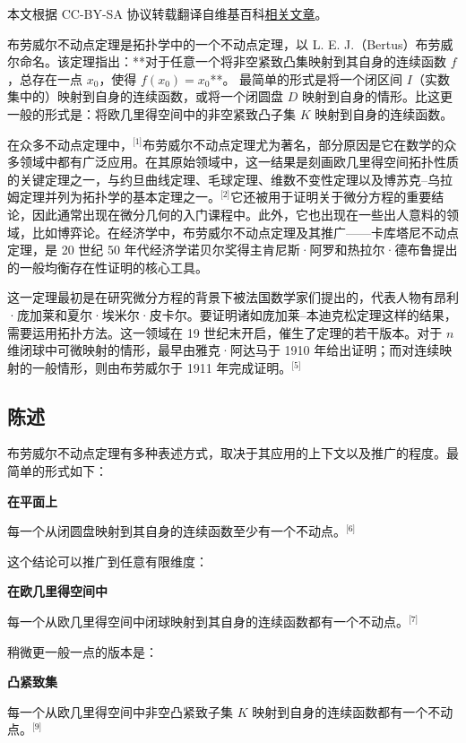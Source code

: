 
本文根据 CC-BY-SA 协议转载翻译自维基百科\href{https://en.wikipedia.org/wiki/Brouwer_fixed-point_theorem}{相关文章}。

布劳威尔不动点定理是拓扑学中的一个不动点定理，以 L. E. J.（Bertus）布劳威尔命名。该定理指出：**对于任意一个将非空紧致凸集映射到其自身的连续函数 $f$，总存在一点 $x_0$，使得 $f(x_0) = x_0$**。
最简单的形式是将一个闭区间 $I$（实数集中的）映射到自身的连续函数，或将一个闭圆盘 $D$ 映射到自身的情形。比这更一般的形式是：将欧几里得空间中的非空紧致凸子集 $K$ 映射到自身的连续函数。

在众多不动点定理中，\(^\text{[1]}\)布劳威尔不动点定理尤为著名，部分原因是它在数学的众多领域中都有广泛应用。在其原始领域中，这一结果是刻画欧几里得空间拓扑性质的关键定理之一，与约旦曲线定理、毛球定理、维数不变性定理以及博苏克–乌拉姆定理并列为拓扑学的基本定理之一。\(^\text{[2]}\)它还被用于证明关于微分方程的重要结论，因此通常出现在微分几何的入门课程中。此外，它也出现在一些出人意料的领域，比如博弈论。在经济学中，布劳威尔不动点定理及其推广——卡库塔尼不动点定理，是 20 世纪 50 年代经济学诺贝尔奖得主肯尼斯·阿罗和热拉尔·德布鲁提出的一般均衡存在性证明的核心工具。

这一定理最初是在研究微分方程的背景下被法国数学家们提出的，代表人物有昂利·庞加莱和夏尔·埃米尔·皮卡尔。要证明诸如庞加莱–本迪克松定理这样的结果，需要运用拓扑方法。这一领域在 19 世纪末开启，催生了定理的若干版本。对于 $n$ 维闭球中可微映射的情形，最早由雅克·阿达马于 1910 年给出证明；而对连续映射的一般情形，则由布劳威尔于 1911 年完成证明。\(^\text{[5]}\)
\subsection{陈述}
布劳威尔不动点定理有多种表述方式，取决于其应用的上下文以及推广的程度。最简单的形式如下：

\textbf{在平面上}

每一个从闭圆盘映射到其自身的连续函数至少有一个不动点。\(^\text{[6]}\)

这个结论可以推广到任意有限维度：

\textbf{在欧几里得空间中}

每一个从欧几里得空间中闭球映射到其自身的连续函数都有一个不动点。\(^\text{[7]}\)

稍微更一般一点的版本是：

\textbf{凸紧致集}

每一个从欧几里得空间中非空凸紧致子集 $K$ 映射到自身的连续函数都有一个不动点。\(^\text{[9]}\)

